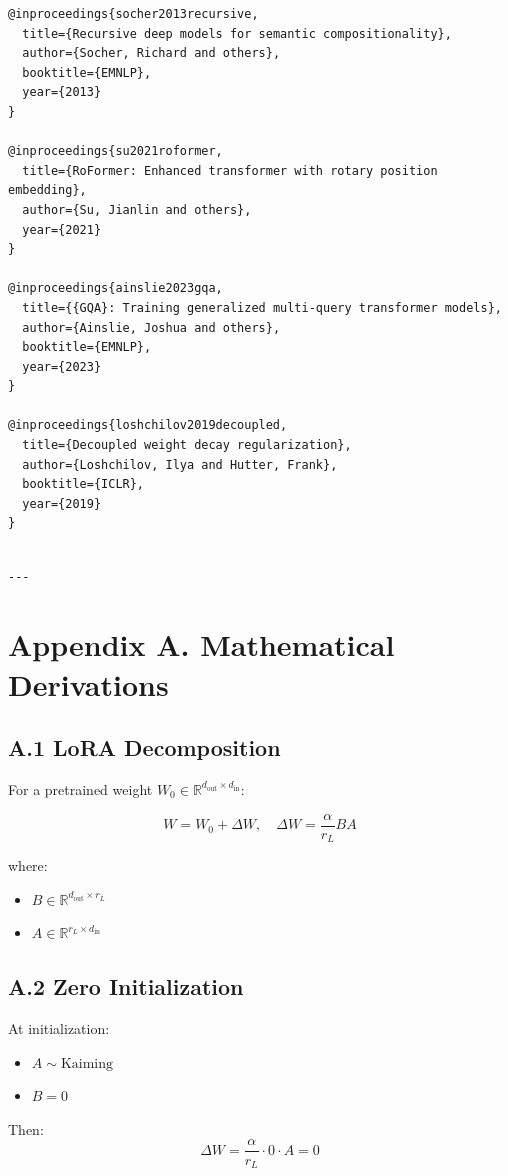 \begin{lstlisting}
@inproceedings{socher2013recursive,
  title={Recursive deep models for semantic compositionality},
  author={Socher, Richard and others},
  booktitle={EMNLP},
  year={2013}
}

@inproceedings{su2021roformer,
  title={RoFormer: Enhanced transformer with rotary position embedding},
  author={Su, Jianlin and others},
  year={2021}
}

@inproceedings{ainslie2023gqa,
  title={{GQA}: Training generalized multi-query transformer models},
  author={Ainslie, Joshua and others},
  booktitle={EMNLP},
  year={2023}
}

@inproceedings{loshchilov2019decoupled,
  title={Decoupled weight decay regularization},
  author={Loshchilov, Ilya and Hutter, Frank},
  booktitle={ICLR},
  year={2019}
}
\end{lstlisting}
\begin{lstlisting}

---
\end{lstlisting}

\section{Appendix A. Mathematical Derivations}

\subsection{A.1 LoRA Decomposition}

For a pretrained weight $W_0 \in \mathbb{R}^{d_\text{out} \times d_\text{in}}$:

\[
W = W_0 + \Delta W, \quad \Delta W = \frac{\alpha}{r_L} B A
\tag{A.1}
\]

where:
\begin{itemize}
\item $B \in \mathbb{R}^{d_\text{out} \times r_L}$
\item $A \in \mathbb{R}^{r_L \times d_\text{in}}$

\end{itemize}
\subsection{A.2 Zero Initialization}

At initialization:
\begin{itemize}
\item $A \sim \text{Kaiming}$
\item $B = 0$

\end{itemize}
Then:
\[
\Delta W = \frac{\alpha}{r_L} \cdot 0 \cdot A = 0
\tag{A.2}
\]

